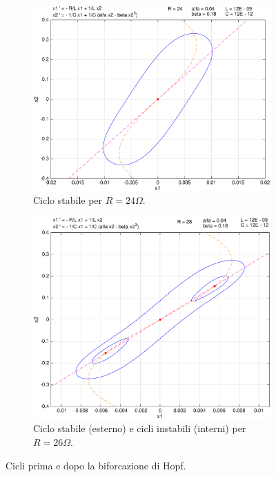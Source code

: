 \begin{enumerate}
\begin{figure}
\centering
    \begin{subfigure}[b]{0.8\textwidth}
            \includegraphics[width=\textwidth]{pplane/Cycle24ohm}
            \caption{Ciclo stabile per $R = 24 \Omega$.}
    \end{subfigure}
    \par\bigskip
    \begin{subfigure}[b]{0.8\textwidth}
            \includegraphics[width=\textwidth]{pplane/Cycle26ohm}
            \caption{Ciclo stabile (esterno) e cicli instabili (interni) per $R = 26 \Omega$.}
            \label{fig:hopf}
    \end{subfigure}
    \caption{Cicli prima e dopo la biforcazione di Hopf.}
    \label{fig:cicli-hopf}
\end{figure}


\end{enumerate}
